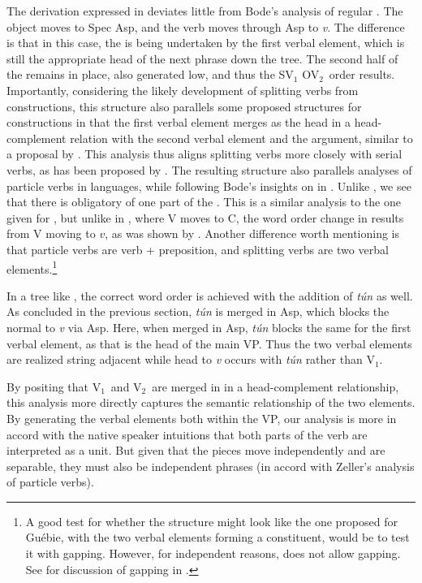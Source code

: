 \documentclass[output=paper,newtxmath,modfonts,nonflat,draftmode]{langsci/langscibook}
\begin{document}
The derivation expressed in  deviates little from Bode's analysis of regular . The object moves to Spec Asp, and the verb moves through Asp to \textit{v}. The difference is that in this case, the  is being undertaken by the first verbal element, which is still the appropriate head of the next phrase down the tree. The second half of the  remains in place, also generated low, and thus the SV$_{1}$ OV$_{2}$\ order results. Importantly, considering the likely development of splitting verbs from  constructions, this structure also parallels some proposed structures for  constructions in that the first verbal element merges as the head in a head-complement relation with the second verbal element and the argument, similar to a proposal by \citet{Baker2002}. This analysis thus aligns splitting verbs more closely with serial verbs, as has been proposed by \citet{Bamgbose1966}. The resulting structure also parallels analyses of particle verbs in  languages, while following Bode's insights on  in . Unlike , we see that there is obligatory  of one part of the . This is a similar analysis to the one given for , but unlike in , where V moves to C, the word order change in  results from V moving to $v$, as was shown by \citet{Bode2007}. Another difference worth mentioning is that particle verbs are verb + preposition, and splitting verbs are two verbal elements.\footnote{A good test for whether the structure might look like the one \citet{Sande2016} proposed for Guébie, with the two verbal elements forming a constituent, would be to test it with gapping. However, for independent reasons,  does not allow gapping. See \citet{Lawal1985} for discussion of gapping in .}

In a tree like , the correct word order is achieved with the addition of \textit{tún} as well. As concluded in the previous section, \textit{tún} is merged in Asp, which blocks the normal  to \textit{v} via Asp. Here, when merged in Asp, \textit{tún} blocks the same  for the first verbal element, as that is the head of the main VP. Thus the two verbal elements are realized string adjacent while head  to \textit{v} occurs with \textit{tún} rather than V$_{1}$.

By positing that V$_{1}$\ and V$_{2}$\ are merged in in a head-complement relationship, this analysis more directly captures the semantic relationship of the two elements. By generating the verbal elements both within the VP, our analysis is more in accord with the native speaker intuitions that both parts of the verb are interpreted as a unit. But given that the pieces move independently and are separable, they must also be independent phrases (in accord with Zeller's analysis of particle verbs).
\end{document}
